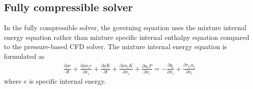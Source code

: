 



\subsection{Fully compressible solver}
In the fully compressible solver, the governing equation uses the mixture internal energy equation rather than mixture specific internal enthalpy equation compared to the pressure-based CFD solver. The mixture internal energy equation is formulated as
\begin{align}
 &\frac{\partial \rho e}{\partial t}+\frac{\partial \rho u_i e}{\partial x_i}+\frac{\partial \rho K}{\partial t}+\frac{\partial \rho u_i K}{\partial x_i}+\frac{\partial  u_i P}{\partial x_i}=-\frac{\partial q_i}{\partial x_i} +\frac{\partial \tau_{ij}u_j}{\partial x_i}
\end{align}
where $e$ is specific internal energy. 


